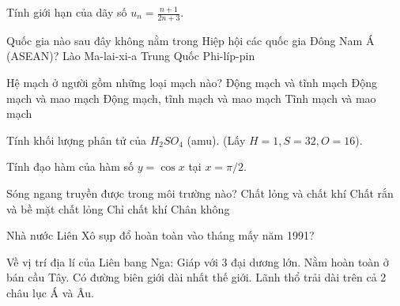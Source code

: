 \begin{ex}
    Tính giới hạn của dãy số $u_n = \frac{n+1}{2n+3}$.
\end{ex}

\begin{ex}
    Quốc gia nào sau đây không nằm trong Hiệp hội các quốc gia Đông Nam Á (ASEAN)?
    \choice
    {Lào}
    {Ma-lai-xi-a}
    {\True Trung Quốc}
    {Phi-líp-pin}
\end{ex}

\begin{ex}
    Hệ mạch ở người gồm những loại mạch nào?
    \choice
    {Động mạch và tĩnh mạch}
    {Động mạch và mao mạch}
    {\True Động mạch, tĩnh mạch và mao mạch}
    {Tĩnh mạch và mao mạch}
\end{ex}

\begin{ex}
    Tính khối lượng phân tử của $H_2SO_4$ (amu). (Lấy $H=1, S=32, O=16$).
\end{ex}

\begin{ex}
    Tính đạo hàm của hàm số $y = \cos x$ tại $x = \pi/2$.
\end{ex}

\begin{ex}
    Sóng ngang truyền được trong môi trường nào?
    \choice
    {Chất lỏng và chất khí}
    {\True Chất rắn và bề mặt chất lỏng}
    {Chỉ chất khí}
    {Chân không}
\end{ex}

\begin{ex}
    Nhà nước Liên Xô sụp đổ hoàn toàn vào tháng mấy năm 1991?
\end{ex}

\begin{ex}
    Về vị trí địa lí của Liên bang Nga:
    \choiceTF
    {\True Giáp với 3 đại dương lớn.}
    {Nằm hoàn toàn ở bán cầu Tây.}
    {\True Có đường biên giới dài nhất thế giới.}
    {\True Lãnh thổ trải dài trên cả 2 châu lục Á và Âu.}
\end{ex}

